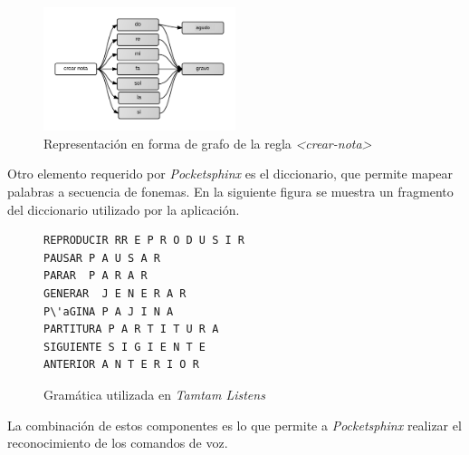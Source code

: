 \begin{figure}[H]
\centering
\includegraphics[width=0.5\textwidth]{./graphics/cmd-crear-nota.png}
\caption{Representaci\'on en forma de grafo de la regla \emph{<crear-nota>}}
\label{figure:cmd-nota}
\end{figure}


Otro elemento requerido por \emph{Pocketsphinx} es el diccionario, que permite mapear
palabras a secuencia de fonemas. En la siguiente figura se muestra un fragmento del diccionario
utilizado por la aplicaci\'on.

\begin{figure}[H]
\begin{lstlisting}
REPRODUCIR RR E P R O D U S I R
PAUSAR P A U S A R
PARAR  P A R A R
GENERAR  J E N E R A R
P\'aGINA P A J I N A
PARTITURA P A R T I T U R A
SIGUIENTE S I G I E N T E
ANTERIOR A N T E R I O R
\end{lstlisting}
\caption{Gram\'atica utilizada en \emph{Tamtam Listens}}
\end{figure}

La combinaci\'on de estos componentes es lo que permite a \emph{Pocketsphinx} realizar el
reconocimiento de los comandos de voz.
